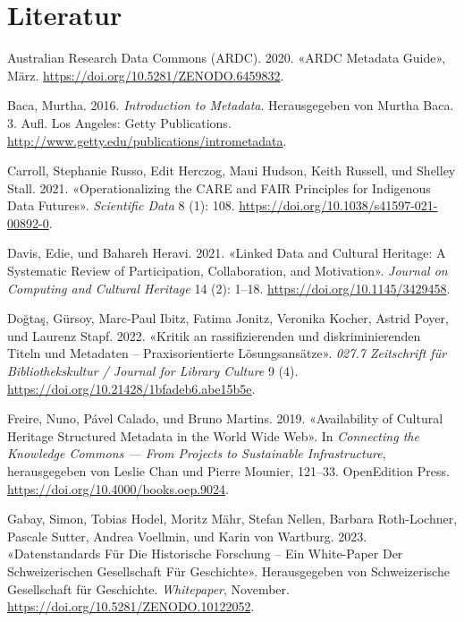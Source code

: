 \documentclass[
  letterpaper,
  DIV=11,
  numbers=noendperiod]{scrartcl}
\newlength{\cslhangindent}
\newenvironment{CSLReferences}[2] %
 {\begin{list}{}{%
  \setlength{\itemindent}{0pt}
  \setlength{\leftmargin}{0pt}
  \setlength{\parsep}{0pt}
  \ifodd #1
   \setlength{\leftmargin}{\cslhangindent}
   \setlength{\itemindent}{-1\cslhangindent}
  \fi
  \setlength{\itemsep}{#2\baselineskip}}}
 {\end{list}}
\begin{document}
\section{Literatur}\label{literatur}

\label{refs}
\begin{CSLReferences}{1}{0}
Australian Research Data Commons (ARDC). 2020. {«{ARDC Metadata
Guide}»}, März. \url{https://doi.org/10.5281/ZENODO.6459832}.

Baca, Murtha. 2016. \emph{Introduction to Metadata}. Herausgegeben von
Murtha Baca. 3. Aufl. Los Angeles: Getty Publications.
\url{http://www.getty.edu/publications/intrometadata}.

Carroll, Stephanie Russo, Edit Herczog, Maui Hudson, Keith Russell, und
Shelley Stall. 2021. {«Operationalizing the {CARE} and {FAIR Principles}
for {Indigenous} Data Futures»}. \emph{Scientific Data} 8 (1): 108.
\url{https://doi.org/10.1038/s41597-021-00892-0}.

Davis, Edie, und Bahareh Heravi. 2021. {«Linked {Data} and {Cultural
Heritage}: {A Systematic Review} of {Participation}, {Collaboration},
and {Motivation}»}. \emph{Journal on Computing and Cultural Heritage} 14
(2): 1--18. \url{https://doi.org/10.1145/3429458}.

Doğtaş, Gürsoy, Marc-Paul Ibitz, Fatima Jonitz, Veronika Kocher, Astrid
Poyer, und Laurenz Stapf. 2022. {«Kritik an rassifizierenden und
diskriminierenden Titeln und Metadaten -- Praxisorientierte
Lösungsansätze»}. \emph{027.7 Zeitschrift für Bibliothekskultur /
Journal for Library Culture} 9 (4).
\url{https://doi.org/10.21428/1bfadeb6.abe15b5e}.

Freire, Nuno, Pável Calado, und Bruno Martins. 2019. {«Availability of
{Cultural Heritage Structured Metadata} in the {World Wide Web}»}. In
\emph{Connecting the {Knowledge Commons} --- {From Projects} to
{Sustainable Infrastructure}}, herausgegeben von Leslie Chan und Pierre
Mounier, 121--33. OpenEdition Press.
\url{https://doi.org/10.4000/books.oep.9024}.

Gabay, Simon, Tobias Hodel, Moritz Mähr, Stefan Nellen, Barbara
Roth-Lochner, Pascale Sutter, Andrea Voellmin, und Karin von Wartburg.
2023. {«Datenstandards Für Die Historische {Forschung} -- {Ein
White-Paper} Der {Schweizerischen Gesellschaft} Für {Geschichte}»}.
Herausgegeben von Schweizerische Gesellschaft für Geschichte.
\emph{Whitepaper}, November.
\url{https://doi.org/10.5281/ZENODO.10122052}.


\end{CSLReferences}
\end{document}
